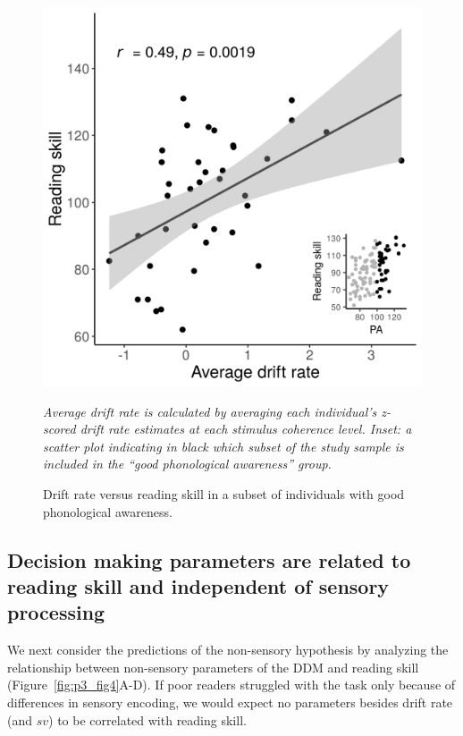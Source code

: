 \documentclass[../uwthesis.tex]{subfiles}
\begin{document}
\begin{figure}
    \centering
    \caption{Drift rate versus reading skill in a subset of individuals with good
phonological awareness.}
    \label{fig:p3_fig3}
    \includegraphics{images/paper_3/3_Explanatory_value_inset.png}
    \item \textit{Average drift rate is calculated by averaging each individual’s z-scored drift rate estimates at each stimulus coherence level. Inset: a scatter plot indicating in black which subset of the study sample is included in the “good phonological awareness” group.}

\end{figure}

\subsection{Decision making parameters are related to reading skill and independent of sensory processing}

We next consider the predictions of the non-sensory hypothesis by analyzing the
relationship between non-sensory parameters of the DDM and reading skill (Figure~\ref{fig:p3_fig4}A-D). If poor readers struggled with the task only because of differences in sensory encoding, we would expect no parameters besides drift rate (and $sv$) to be correlated with reading skill.
\end{document}
